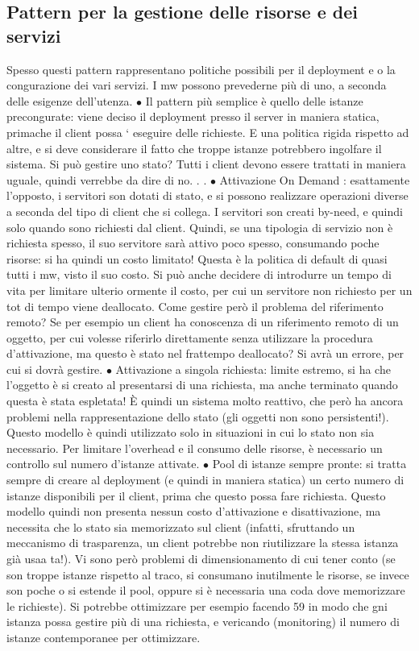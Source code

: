 \subsection{Pattern per la gestione delle risorse e dei servizi}
Spesso questi pattern rappresentano politiche possibili per il deployment e o la
congurazione dei vari servizi. I mw possono prevederne più di uno, a seconda
delle esigenze dell'utenza.
$\bullet$ Il pattern più semplice è quello delle istanze precongurate: viene deciso
il deployment presso il server in maniera statica, primache il client possa
`
eseguire delle richieste. E una politica rigida rispetto ad altre, e si deve
considerare il fatto che troppe istanze potrebbero ingolfare il sistema. Si
può gestire uno stato? Tutti i client devono essere trattati in maniera
uguale, quindi verrebbe da dire di no. . .
$\bullet$ Attivazione On Demand : esattamente l'opposto, i servitori son dotati di
stato, e si possono realizzare operazioni diverse a seconda del tipo di client
che si collega. I servitori son creati by-need, e quindi solo quando sono
richiesti dal client. Quindi, se una tipologia di servizio non è richiesta
spesso, il suo servitore sarà attivo poco spesso, consumando poche risorse:
si ha quindi un costo limitato! Questa è la politica di default di quasi tutti
i mw, visto il suo costo.
Si può anche decidere di introdurre un tempo di vita per limitare ulterio
ormente il costo, per cui un servitore non richiesto per un tot di tempo
viene deallocato.
Come gestire però il problema del riferimento remoto? Se per esempio
un client ha conoscenza di un riferimento remoto di un oggetto, per cui
volesse riferirlo direttamente senza utilizzare la procedura d'attivazione,
ma questo è stato nel frattempo deallocato? Si avrà un errore, per cui si
dovrà gestire.
$\bullet$ Attivazione a singola richiesta: limite estremo, si ha che l'oggetto è si
creato al presentarsi di una richiesta, ma anche terminato quando questa è stata espletata! È quindi un sistema molto
reattivo, che però ha ancora problemi nella rappresentazione dello stato (gli oggetti non sono persistenti!). Questo
modello è quindi utilizzato solo in situazioni in cui lo stato non sia necessario. Per limitare l'overhead e il consumo
delle risorse, è necessario un controllo sul numero d'istanze attivate.
$\bullet$ Pool di istanze sempre pronte: si tratta sempre di creare al deployment
(e quindi in maniera statica) un certo numero di istanze disponibili per
il client, prima che questo possa fare richiesta. Questo modello quindi
non presenta nessun costo d'attivazione e disattivazione, ma necessita che
lo stato sia memorizzato sul client (infatti, sfruttando un meccanismo di
trasparenza, un client potrebbe non riutilizzare la stessa istanza già usaa
ta!). Vi sono però problemi di dimensionamento di cui tener conto (se son
troppe istanze rispetto al traco, si consumano inutilmente le risorse, se
invece son poche o si estende il pool, oppure si è necessaria una coda dove
memorizzare le richieste). Si potrebbe ottimizzare per esempio facendo
59
in modo che gni istanza possa gestire più di una richiesta, e vericando
(monitoring) il numero di istanze contemporanee per ottimizzare.

